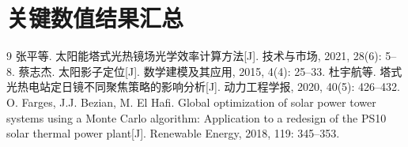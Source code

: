 \documentclass[12pt]{ctexart}
\begin{document}
\section{关键数值结果汇总}
\begin{table}[H]
\centering
{}
\caption{三个问题关键结果汇总}
\label{tab:summary}
\end{table}

\begin{thebibliography}{9}
 张平等. 太阳能塔式光热镜场光学效率计算方法[J]. 技术与市场, 2021, 28(6): 5--8.
 蔡志杰. 太阳影子定位[J]. 数学建模及其应用, 2015, 4(4): 25--33.
 杜宇航等. 塔式光热电站定日镜不同聚焦策略的影响分析[J]. 动力工程学报, 2020, 40(5): 426--432.
 O. Farges, J.J. Bezian, M. El Hafi. Global optimization of solar power tower systems using a Monte Carlo algorithm: Application to a redesign of the PS10 solar thermal power plant[J]. Renewable Energy, 2018, 119: 345--353.
\end{thebibliography}
\end{document}
